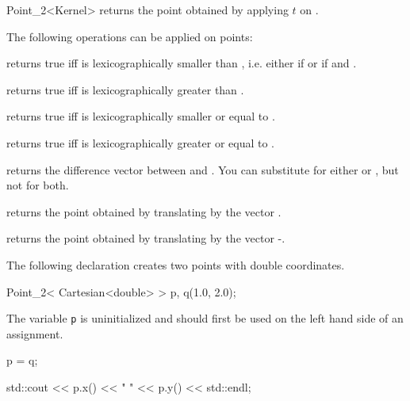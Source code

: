 \begin{ccRefClass} {Point_2<Kernel>}
       {returns the point obtained by applying $t$ on \ccVar.}



The following operations can be applied on points:

       {returns true iff  is lexicographically smaller than ,
       i.e. either if  or if  and
       .}

       {returns true iff  is lexicographically greater than .}

       {returns true iff  is lexicographically smaller or equal to .}

       {returns true iff  is lexicographically greater or equal to .}

       {returns the difference vector between  and . 
        You can substitute  for either  or ,
        but not for both.}

       {returns the point obtained by translating  by the 
        vector .}

       {returns the point obtained by translating  by the 
        vector -.}

\ccExample

The following declaration creates two points with
 double coordinates.

\begin{cprog}

  Point_2< Cartesian<double> > p, q(1.0, 2.0);
\end{cprog} 

The variable {\tt p} is uninitialized and should first be used on 
the left hand side of an assignment. 
\begin{cprog}

  p = q;

  std::cout << p.x() << "  " << p.y() << std::endl; 
\end{cprog} 


\ccSeeAlso
{}

\end{ccRefClass} 
